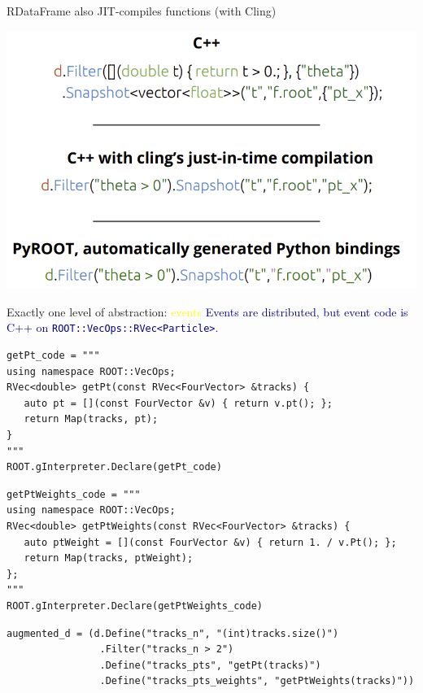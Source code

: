 \documentclass[aspectratio=169]{beamer}
\begin{document}
\begin{frame}{RDataFrame also JIT-compiles functions (with Cling)}
\vspace{0.5 cm}

\begin{center}
\includegraphics[width=0.7\linewidth]{img/rdataframe-jit.png}
\end{center}
\end{frame}

\begin{frame}[fragile]{Exactly one level of abstraction: \textcolor{yellow}{events}}
\vspace{0.25 cm}
\textcolor{darkblue}{Events are distributed, but event code is C++ on \mbox{\texttt{ROOT::VecOps::RVec<Particle>}.\hspace{-1 cm}}}

\scriptsize
\vspace{0.2 cm}
\begin{verbatim}
getPt_code = """
using namespace ROOT::VecOps;
RVec<double> getPt(const RVec<FourVector> &tracks) {
   auto pt = [](const FourVector &v) { return v.pt(); };
   return Map(tracks, pt);
}
"""
ROOT.gInterpreter.Declare(getPt_code)
\end{verbatim}
\vspace{0.1 cm}
\begin{verbatim}
getPtWeights_code = """
using namespace ROOT::VecOps;
RVec<double> getPtWeights(const RVec<FourVector> &tracks) {
   auto ptWeight = [](const FourVector &v) { return 1. / v.Pt(); };
   return Map(tracks, ptWeight);
};
"""
ROOT.gInterpreter.Declare(getPtWeights_code)
\end{verbatim}
\vspace{0.1 cm}
\begin{verbatim}
augmented_d = (d.Define("tracks_n", "(int)tracks.size()")
                .Filter("tracks_n > 2")
                .Define("tracks_pts", "getPt(tracks)")
                .Define("tracks_pts_weights", "getPtWeights(tracks)"))
\end{verbatim}
\end{frame}
\end{document}

